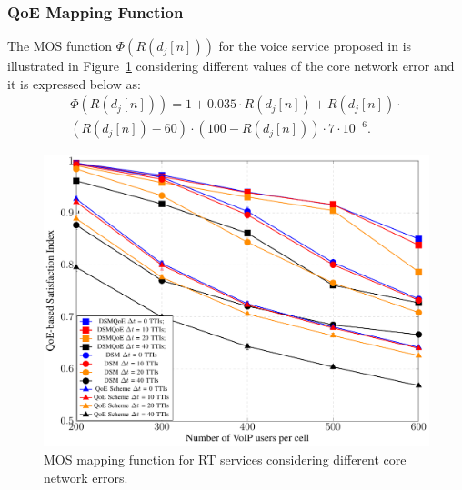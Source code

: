 \documentclass[conference]{IEEEtran}
\newcommand{\FigRef}[1]{Figure~\ref{#1}}
\begin{document}
\subsubsection{QoE Mapping Function}	

The  \ac{MOS} function $\Phi\left(R\left(d_j[n]\right)\right)$ for the voice service proposed in \cite{cole2001voice} is illustrated  in \FigRef{Fig:MOSxNetworkError} considering different values of the core network error and it is expressed below as: 
\begin{multline}\label{MOS_DELAY_FUNC}
\Phi\left(R\left(d_j[n]\right)\right) = 1+ 0.035\cdot R\left(d_j[n]\right)+ R\left(d_j[n]\right)\cdot \\
\left(R\left(d_j[n]\right) - 60\right) \cdot \left(100 - R\left(d_j[n]\right)\right)\cdot 7 \cdot  10^{-6}.
\end{multline}

\begin{figure}
	\centering
	\includegraphics[width=0.55\linewidth,page=7]{figs_wp2/figs_BRUNO_PEDRO/plotsCSI}
	\caption{MOS mapping function for RT services considering different core network errors.}
	\label{Fig:MOSxNetworkError}		
\end{figure}
\end{document}
